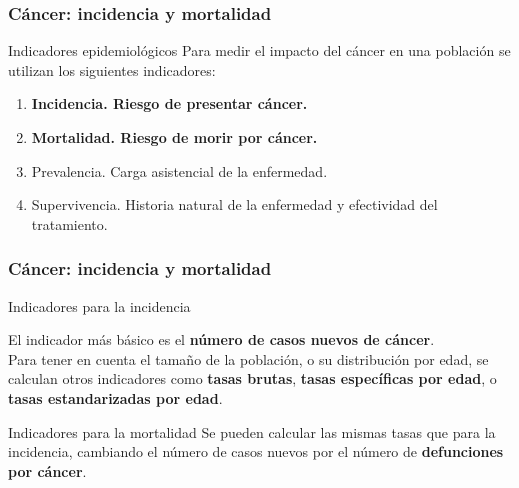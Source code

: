 \documentclass{beamer}
\begin{document}
\begin{frame}\frametitle{Cáncer: incidencia y mortalidad}

	\begin{block}{Indicadores epidemiológicos}
		Para medir el impacto del cáncer en una población se utilizan los siguientes indicadores:\\
		\begin{enumerate}
			\item \textbf{Incidencia. Riesgo de presentar cáncer.}\\[2ex]
			\item \textbf{Mortalidad. Riesgo de morir por cáncer.}\\[2ex]
			\item Prevalencia. Carga asistencial de la enfermedad.\\[2ex]
			\item Supervivencia. Historia natural de la enfermedad y efectividad del tratamiento. \\[2ex]
		\end{enumerate}
	\end{block}

\end{frame}


\begin{frame}\frametitle{Cáncer: incidencia y mortalidad}

	\begin{block}{Indicadores para la incidencia}
		
		El indicador más básico es el \textbf{número de casos nuevos de cáncer}.\\[2ex]
		
		Para tener en cuenta el tamaño de la población, o su distribución por edad, se calculan otros indicadores como \textbf{tasas brutas}, \textbf{tasas específicas por edad}, o \textbf{tasas estandarizadas por edad}.
	\end{block}

	\begin{block}{Indicadores para la mortalidad}
		Se pueden calcular las mismas tasas que para la incidencia, cambiando el número de casos nuevos por el número de \textbf{defunciones por cáncer}.
	\end{block}
\end{frame}

\end{document}

